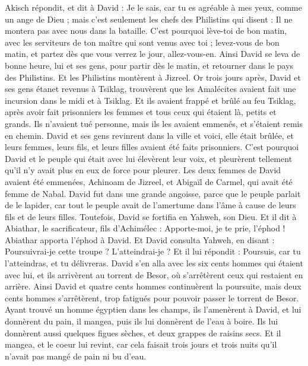 \begin{multicols}{2}
Akisch répondit, et dit à David : Je le sais, car tu es agréable à mes yeux, comme un ange de Dieu ; mais c'est seulement les chefs des Philistins qui disent : Il ne montera pas avec nous dans la bataille.
C'est pourquoi lève-toi de bon matin, avec les serviteurs de ton maître qui sont venus avec toi ; levez-vous de bon matin, et partez dès que vous verrez le jour, allez-vous-en.
Ainsi David se leva de bonne heure, lui et ses gens, pour partir dès le matin, et retourner dans le pays des Philistins. Et les Philistins montèrent à Jizreel.
\VerseOne{}Or trois jours après, David et ses gens étanet revenus à Tsiklag, trouvèrent que les Amalécites avaient fait une incursion dans le midi et à Tsiklag. Et ils avaient frappé et brûlé au feu Tsiklag,
après avoir fait prisonniers les femmes et tous ceux qui étaient là, petits et grands. Ils n'avaient tué personne, mais ils les avaient emmenés, et s'étaient remis en chemin.
David et ses gens revinrent dans la ville et voici, elle était brûlée, et leurs femmes, leurs fils, et leurs filles avaient été faits prisonniers.
C'est pourquoi David et le peuple qui était avec lui élevèrent leur voix, et pleurèrent tellement qu'il n'y avait plus en eux de force pour pleurer.
Les deux femmes de David avaient été emmenées, Achinoam de Jizreel, et Abigaïl de Carmel, qui avait été femme de Nabal.
David fut dans une grande angoisse, parce que le peuple parlait de le lapider, car tout le peuple avait de l'amertume dans l'âme à cause de leurs fils et de leurs filles. Toutefois, David se fortifia en Yahweh, son Dieu.
Et il dit à Abiathar, le sacrificateur, fils d'Achimélec : Apporte-moi, je te prie, l'éphod ! Abiathar apporta l'éphod à David.
Et David consulta Yahweh, en disant : Poursuivrai-je cette troupe ? L'atteindrai-je ? Et il lui répondit : Poursuis, car tu l'atteindras, et tu délivreras.
David s'en alla avec les six cents hommes qui étaient avec lui, et ils arrivèrent au torrent de Besor, où s'arrêtèrent ceux qui restaient en arrière.
Ainsi David et quatre cents hommes continuèrent la poursuite, mais deux cents hommes s'arrêtèrent, trop fatigués pour pouvoir passer le torrent de Besor.
Ayant trouvé un homme égyptien dans les champs, ils l'amenèrent à David, et lui donnèrent du pain, il mangea, puis ils lui donnèrent de l'eau à boire.
Ils lui donnèrent aussi quelques figues sèches, et deux grappes de raisins secs. Et il mangea, et le coeur lui revint, car cela faisait trois jours et trois nuits qu'il n'avait pas mangé de pain ni bu d'eau.

\end{multicols}
